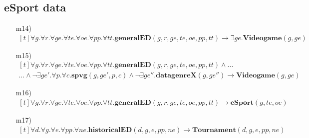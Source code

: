 \subsection*{eSport data}
\begin{itemize}
	\item[m14)]
	$ \begin{aligned}[t]
	\forall g. \forall r. \forall ge. \forall te. \forall oe. \forall pp. \forall tt.\textbf{generalED}(g,r,ge,te,oe,pp,tt) \rightarrow \exists ge. \textbf{Videogame}(g,ge)
	\end{aligned} $
	\item[m15)]
	$ \begin{aligned}[t]
	\forall g. \forall r. \forall ge. \forall te. \forall oe. \forall pp. \forall tt.\textbf{generalED}(g,r,ge,te,oe,pp,tt) \wedge ... \hspace{150pt}\\
	... \wedge \neg \exists ge'. \forall p. \forall c. \textbf{spvg}(g,ge',p,c) \wedge
	\neg \exists ge''.\textbf{datagenreX}(g,ge'')
	\rightarrow \textbf{Videogame}(g,ge)
	\end{aligned} $
	\item[m16)]
	$ \begin{aligned}[t]
		\forall g. \forall r. \forall ge. \forall te. \forall oe. \forall pp. \forall tt.\textbf{generalED}(g,r,ge,te,oe,pp,tt) \rightarrow \textbf{eSport}(g,te,oe)
	\end{aligned} $
	\item[m17)]
	$ \begin{aligned}[t]
	\forall d. \forall g. \forall e. \forall pp. \forall ne.\textbf{historicalED}(d,g,e,pp,ne) \rightarrow \textbf{Tournament}(d,g,e,pp,ne)
	\end{aligned} $
\end{itemize}

%	
